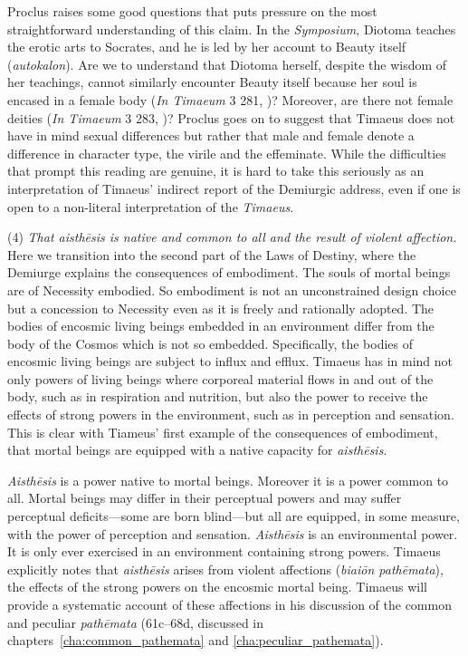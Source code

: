 Proclus raises some good questions that puts pressure on the most straightforward understanding of this claim. In the \emph{Symposium}, Diotoma teaches the erotic arts to Socrates, and he is led by her account to Beauty itself (\emph{autokalon}). Are we to understand that Diotoma herself, despite the wisdom of her teachings, cannot similarly encounter Beauty itself because her soul is encased in a female body (\emph{In Timaeum} 3 281, \citealt{Diehl:1903re})? Moreover, are there not female deities (\emph{In Timaeum} 3 283, \citealt{Diehl:1903re})? Proclus goes on to suggest that Timaeus does not have in mind sexual differences but rather that male and female denote a difference in character type, the virile and the effeminate. While the difficulties that prompt this reading are genuine, it is hard to take this seriously as an interpretation of Timaeus' indirect report of the Demiurgic address, even if one is open to a non-literal interpretation of the \emph{Timaeus}.

(4) \emph{That \emph{aisthēsis} is native and common to all and the result of violent affection.} Here we transition into the second part of the Laws of Destiny, where the Demiurge explains the consequences of embodiment. The souls of mortal beings are of Necessity embodied. So embodiment is not an unconstrained design choice but a concession to Necessity even as it is freely and rationally adopted. The bodies of encosmic living beings embedded in an environment differ from the body of the Cosmos which is not so embedded. Specifically, the bodies of encosmic living beings are subject to influx and efflux. Timaeus has in mind not only powers of living beings where corporeal material flows in and out of the body, such as in respiration and nutrition, but also the power to receive the effects of strong powers in the environment, such as in perception and sensation. This is clear with Tiameus' first example of the consequences of embodiment, that mortal beings are equipped with a native capacity for \emph{aisthēsis}.

\emph{Aisthēsis} is a power native to mortal beings. Moreover it is a power common to all. Mortal beings may differ in their perceptual powers and may suffer perceptual deficits---some are born blind---but all are equipped, in some measure, with the power of perception and sensation. \emph{Aisthēsis} is an environmental power. It is only ever exercised in an environment containing strong powers. Timaeus explicitly notes that \emph{aisthēsis} arises from violent affections (\emph{biaiōn pathēmata}), the effects of the strong powers on the encosmic mortal being. Timaeus will provide a systematic account of these affections in his discussion of the common and peculiar \emph{pathēmata} (61c--68d, discussed in chapters~\ref{cha:common_pathemata} and \ref{cha:peculiar_pathemata}).

